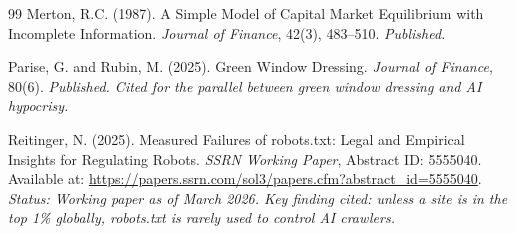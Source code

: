 \documentclass[12pt,a4paper]{article}
\begin{document}
\begin{thebibliography}{99}
Merton, R.C. (1987).
\newblock A Simple Model of Capital Market Equilibrium with Incomplete Information.
\newblock \emph{Journal of Finance}, 42(3), 483--510.
\newblock \textit{Published.}

Parise, G. and Rubin, M. (2025).
\newblock Green Window Dressing.
\newblock \emph{Journal of Finance}, 80(6).
\newblock \textit{Published. Cited for the parallel between green window dressing and AI hypocrisy.}

Reitinger, N. (2025).
\newblock Measured Failures of robots.txt: Legal and Empirical Insights for Regulating Robots.
\newblock \emph{SSRN Working Paper}, Abstract ID: 5555040.
\newblock Available at: \url{https://papers.ssrn.com/sol3/papers.cfm?abstract_id=5555040}.
\newblock \textit{Status: Working paper as of March 2026. Key finding cited: unless a site is in the top 1\% globally, robots.txt is rarely used to control AI crawlers.}

\end{thebibliography}
\end{document}
